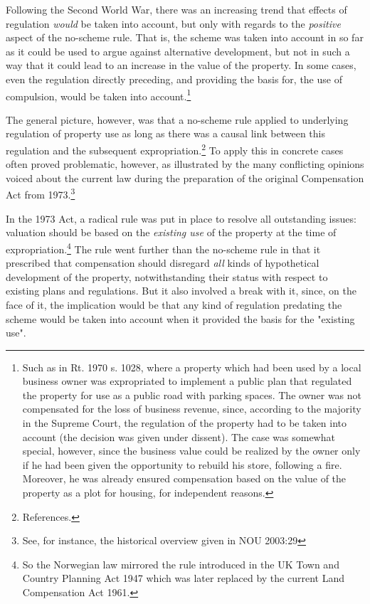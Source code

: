 Following the Second World War, there was an increasing trend that effects of regulation \emph{would} be taken into account, but only with regards to the \emph{positive} aspect of the no-scheme rule. That is, the scheme was taken into account in so far as it could be used to argue against alternative development, but not in such a way that it could lead to an increase in the value of the property. In some cases, even the regulation directly preceding, and providing the basis for, the use of compulsion, would be taken into account.\footnote{Such as in Rt. 1970 s. 1028, where a property which had been used by a local business owner was expropriated to implement a public plan that regulated the property for use as a public road with parking spaces. The owner was not compensated for the loss of business revenue, since, according to the majority in the Supreme Court, the regulation of the property had to be taken into account (the decision was given under dissent). The case was somewhat special, however, since the business value could be realized by the owner only if he had been given the opportunity to rebuild his store, following a fire. Moreover, he was already ensured compensation based on the value of the property as a plot for housing, for independent reasons.}

The general picture, however, was that a no-scheme rule applied to underlying regulation of property use as long as there was a causal link between this regulation and the subsequent expropriation.\footnote{References. } To apply this in concrete cases often proved problematic, however, as illustrated by the many conflicting opinions voiced about the current law during the preparation of the original Compensation Act from 1973.\footnote{See, for instance, the historical overview given in NOU 2003:29}

In the 1973 Act, a radical rule was put in place to resolve all outstanding issues: valuation should be based on the  \emph{existing use} of the property at the time of expropriation.\footnote{So the Norwegian law mirrored the rule introduced in the UK Town and Country Planning Act 1947 which was later replaced by the current Land Compensation Act 1961.} The rule went further than the no-scheme rule in that it prescribed that compensation should disregard \emph{all} kinds of hypothetical development of the property, notwithstanding their status with respect to existing plans and regulations. But it also involved a break with it, since, on the face of it, the implication would be that any kind of regulation predating the scheme would be taken into account when it provided the basis for the "existing use".

